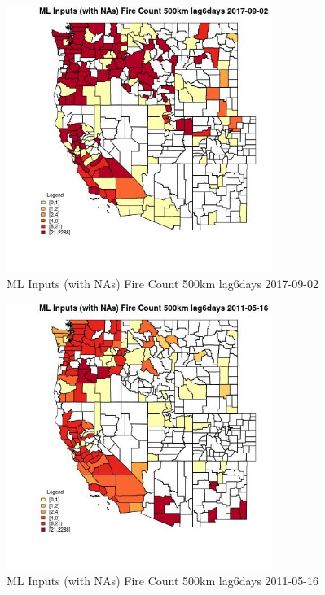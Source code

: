 \begin{figure} 
\centering  
\includegraphics[width=0.77\textwidth]{Code_Outputs/Report_ML_input_PM25_Step4_part_e_de_duplicated_aves_compiled_2019-05-21wNAs_CountyFire_Count_500km_lag6daysMean2017-09-02.jpg} 
\caption{\label{fig:Report_ML_input_PM25_Step4_part_e_de_duplicated_aves_compiled_2019-05-21wNAsCountyFire_Count_500km_lag6daysMean2017-09-02}ML Inputs (with NAs) Fire Count 500km lag6days 2017-09-02} 
\end{figure} 
 

\begin{figure} 
\centering  
\includegraphics[width=0.77\textwidth]{Code_Outputs/Report_ML_input_PM25_Step4_part_e_de_duplicated_aves_compiled_2019-05-21wNAs_CountyFire_Count_500km_lag6daysMean2011-05-16.jpg} 
\caption{\label{fig:Report_ML_input_PM25_Step4_part_e_de_duplicated_aves_compiled_2019-05-21wNAsCountyFire_Count_500km_lag6daysMean2011-05-16}ML Inputs (with NAs) Fire Count 500km lag6days 2011-05-16} 
\end{figure} 
 

